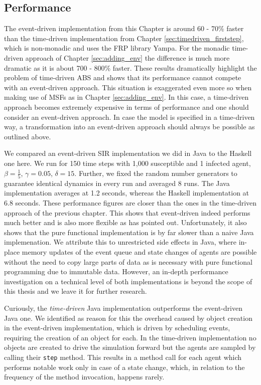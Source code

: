 \subsection{Performance}
\label{sub:eventdriven_performance}
The event-driven implementation from this Chapter is around 60 - 70\% faster than the time-driven implementation from Chapter \ref{sec:timedriven_firststep}, which is non-monadic and uses the FRP library Yampa. For the monadic time-driven approach of Chapter \ref{sec:adding_env} the difference is much more dramatic as it is about 700 - 800\% faster. These results dramatically highlight the problem of time-driven ABS and shows that its performance cannot compete with an event-driven approach. This situation is exaggerated even more so when making use of MSFs as in Chapter \ref{sec:adding_env}. In this case, a time-driven approach becomes extremely expensive in terms of performance and one should consider an event-driven approach. In case the model is specified in a time-driven way, a transformation into an event-driven approach should always be possible as outlined above.

We compared an event-driven SIR implementation we did in Java to the Haskell one here. We run for 150 time steps with 1,000 susceptible and 1 infected agent, $\beta = \frac{1}{5}$, $\gamma = 0.05$, $\delta = 15$. Further, we fixed the random number generators to guarantee identical dynamics in every run and averaged 8 runs. The Java implementation averages at 1.2 seconds, whereas the Haskell implementation at 6.8 seconds. These performance figures are closer than the ones in the time-driven approach of the previous chapter. This shows that event-driven indeed performs much better and is also more flexible as \cite{meyer_event-driven_2014} has pointed out. Unfortunately, it also shows that the pure functional implementation is by far slower than a naive Java implemenation. We attribute this to unrestricted side effects in Java, where in-place memory updates of the event queue and state changes of agents are possible without the need to copy large parts of data as is necessary with pure functional programming due to immutable data. However, an in-depth performance investigation on a technical level of both implementations is beyond the scope of this thesis and we leave it for further research.

Curiously, the \textit{time-driven} Java implementation outperforms the event-driven Java one. We identified as reason for this the overhead caused by object creation in the event-driven implementation, which is driven by scheduling events, requiring the creation of an object for each. In the time-driven implementation no objects are created to drive the simulation forward but the agents are sampled by calling their \texttt{step} method. This results in a method call for each agent which performs notable work only in case of a state change, which, in relation to the frequency of the method invocation, happens rarely. 

